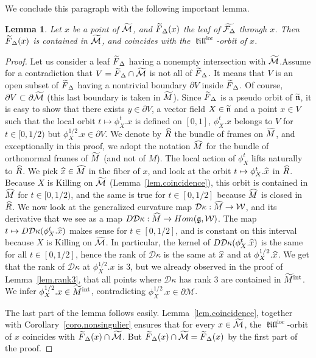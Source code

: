 \documentclass[11pt]{article}
\newtheorem{lemm}[theo]{Lemma}
\theoremstyle{definition}
\numberwithin{equation}{section}
\numberwithin{figure}{section}
\numberwithin{table}{section}
\DeclareMathOperator{\loc}{loc}
\DeclareMathOperator{\intl}{int}
\DeclareMathOperator{\kil}{{\mathfrak{kill}}}
\newcommand{\kiloc}{\kil^{\loc}}
\newcommand{\calm}{\mathcal{M}}
\newcommand{\tcalm}{\tilde{\mathcal{M}}}
\newcommand{\tm}{\tilde{{M}}}
\newcommand{\tFd}{\tilde{{F}}_{\Delta}}
\newcommand{\tcalfd}{\tilde{{\mathcal{F}_{\Delta}}}}
\newcommand*\dk{{\mathcal{D}\kappa}}
\newcommand{\lieg}{{\mathfrak{g}}}
\newcommand{\tlien}{\tilde{\mathfrak{n}}}
\newcommand{\hm}{{\hat{M}}}
\newcommand{\hx}{{\hat{x}}}
\let\oldtilde\tilde
\renewcommand*\tilde[1]{\mathchoice{\widetilde{#1}}{\widetilde{#1}}{\widetilde{#1}}{\oldtilde{#1}}}
\let\oldhat\hat
\renewcommand*\hat[1]{\mathchoice{\widehat{#1}}{\widehat{#1}}{\widehat{#1}}{\oldhat{#1}}}
\begin{document}
We conclude this paragraph with the following important lemma.


\begin{lemm}\label{lem.saturation1}
Let $x$ be a point of $\tcalm$, and $\tilde{F}_{\Delta}(x)$ the leaf of $\tcalfd$ through $x$. Then $\tilde{F}_{\Delta}(x)$ is contained in $ \tcalm$, and coincides with the $\kiloc$-orbit of $x$.
\end{lemm}

\begin{proof}
Let us consider a leaf $\tFd$ having a nonempty intersection with $\tcalm$.\linebreak Assume for a contradiction that $V=\tFd \cap \tcalm$ is not all of $\tFd$. It means that $V$ is an open subset of $\tFd$ having a nontrivial boundary $\partial{V}$ inside $\tFd$. Of course, $\partial V \subset \partial \tcalm$ (this last boundary is taken in $\tm$). Since $\tFd$ is a pseudo orbit of $\tlien$, it is easy to show that there exists $y \in \partial{V}$, a vector field $X \in \tlien$ and a point $x \in {V}$ such that the local orbit $t \mapsto \phi_{X}^t.x$ is defined on $[0,1]$, $\phi_{X}^t.x$ belongs to ${V}$ for $t \in [0,1/2)$ but $\phi_{X}^{1/2}.x \in \partial {V}$. We denote by $\hat{R}$ the bundle of frames on $\tm$, and exceptionally in this proof, we adopt the notation $\hm$ for the bundle of orthonormal frames of $\tm$ (and not of $M$). The local action of $\phi_{X}^t$ lifts naturally to $\hat{R}$. We pick $\hx \in \hm$ in the fiber of $x$, and look at the orbit $t \mapsto \phi_{X}^t.\hx$ in $\hat{R}$. Because $X$ is Killing on $\tcalm$ (Lemma~\ref{lem.coincidence}), this orbit is contained in $\hm$ for $t \in [0,1/2)$, and the same is true for $t \in [0,1/2]$ because $\hm$ is closed in $\hat{R}$. We now look at the generalized curvature map $\dk : \hm \to \mathcal{W}$, and its derivative that we see as a map $D \dk : \hm \to Hom(\lieg, \mathcal{W})$. The map $t \mapsto D \dk(\phi_{X}^t.\hx)$ makes sense for $t \in [0,1/2]$, and is constant on this interval because $X$ is Killing on $\tcalm$. In particular, the kernel of $D \dk(\phi_{X}^t.\hx)$ is the same for all $t \in [0,1/2]$, hence the rank of $\dk$ is the same at $\hx$ and at $\phi_{X}^{1/2}.\hx$. We get that the rank of $\dk$ at $\phi_{X}^{1/2}.x$ is $3$, but we already observed in the proof of Lemma~\ref{lem.rank3}, that all points where $\dk$ has rank $3$ are contained in $\tm^{\intl}$. We infer $\phi_{X}^{1/2}.x \in \tm^{\intl}$, contradicting $\phi_{X}^{1/2}.x \in \partial \calm$.

The last part of the lemma follows easily. Lemma~\ref{lem.coincidence}, together with Corollary~\ref{coro.nonsingulier} ensures that for every $x \in \tcalm$, the $\kiloc$-orbit of $x$ coincides with $\tFd(x) \cap \tcalm$. But $\tFd(x) \cap \tcalm=\tFd(x)$ by the first part of the proof.
\end{proof}
\end{document}
